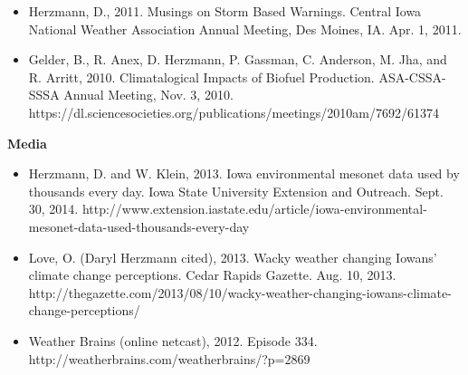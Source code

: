 \begin{itemize}
\item Herzmann, D., 2011. Musings on Storm Based Warnings. Central Iowa National Weather Association Annual Meeting, Des Moines, IA. Apr. 1, 2011.
\item Gelder, B., R. Anex, D. Herzmann, P. Gassman, C. Anderson, M. Jha, and R. Arritt, 2010. Climatalogical Impacts of Biofuel Production. ASA-CSSA-SSSA Annual Meeting, Nov. 3, 2010. https://dl.sciencesocieties.org/publications/meetings/2010am/7692/61374
\end{itemize}

\normalsize \sf
\normalsize \bf Media
\normalsize \sf
\begin{itemize}
\item Herzmann, D. and W. Klein, 2013. Iowa environmental mesonet data used by thousands every day. Iowa State University Extension and Outreach. Sept. 30, 2014. http://www.extension.iastate.edu/article/iowa-environmental-mesonet-data-used-thousands-every-day
\item Love, O. (Daryl Herzmann cited), 2013. Wacky weather changing Iowans’ climate change perceptions. Cedar Rapids Gazette. Aug. 10, 2013. http://thegazette.com/2013/08/10/wacky-weather-changing-iowans-climate-change-perceptions/
\item Weather Brains (online netcast), 2012. Episode 334. http://weatherbrains.com/weatherbrains/?p=2869
\end{itemize}

